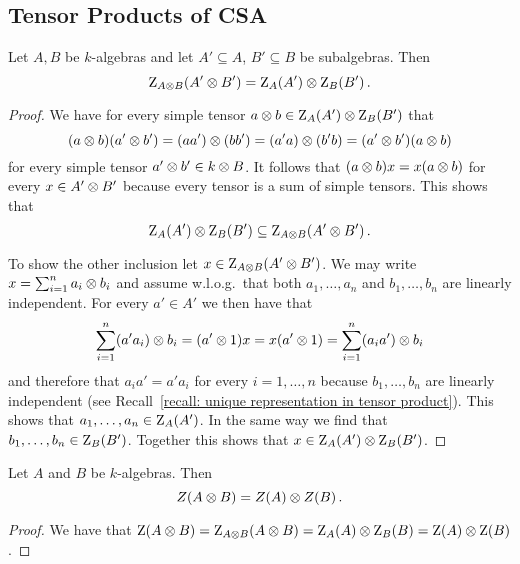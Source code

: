 \subsection{Tensor Products of CSA}


\begin{lemma}
  \label{lemma: centralizer componentwise}
  Let $A, B$ be $k$-algebras and let $A' \subseteq A$, $B' \subseteq B$ be subalgebras.
  Then
  \[
      \operatorname{Z}_{A \mathbin{\otimes} B}(A' \mathbin{\otimes} B')
    = \operatorname{Z}_A(A') \mathbin{\otimes} \operatorname{Z}_B(B') \,.
  \]
\end{lemma}


\begin{proof}
  We have for every simple tensor $a \mathbin{\otimes} b \in \operatorname{Z}_A(A') \mathbin{\otimes} \operatorname{Z}_B(B')$ that
  \[
      (a \mathbin{\otimes} b) (a' \mathbin{\otimes} b')
    = (aa') \mathbin{\otimes} (bb')
    = (a'a) \mathbin{\otimes} (b'b)
    = (a' \mathbin{\otimes} b')(a \mathbin{\otimes} b)
  \]
  for every simple tensor $a' \mathbin{\otimes} b' \in k \mathbin{\otimes} B$.
  It follows that $(a \mathbin{\otimes} b) x = x (a \mathbin{\otimes} b)$ for every $x \in A' \mathbin{\otimes} B'$ because every tensor is a sum of simple tensors.
  This shows that
  \[
              \operatorname{Z}_A(A') \mathbin{\otimes} \operatorname{Z}_B(B')
    \subseteq \operatorname{Z}_{A \mathbin{\otimes} B}(A' \mathbin{\otimes} B') \,.
  \]
  
  To show the other inclusion let $x \in \operatorname{Z}_{A \mathbin{\otimes} B}(A' \mathbin{\otimes} B')$.
  We may write $x = \sum_{i=1}^n a_i \mathbin{\otimes} b_i$ and assume w.l.o.g.\ that both $a_1, \dotsc, a_n$ and $b_1, \dotsc, b_n$ are linearly independent.
  For every $a' \in A'$ we then have that
  \[
      \sum_{i=1}^n (a' a_i) \mathbin{\otimes} b_i
    = (a' \mathbin{\otimes} 1) x
    = x (a' \mathbin{\otimes} 1)
    = \sum_{i=1}^n (a_i a') \mathbin{\otimes} b_i
  \]
  and therefore that $a_i a' = a' a_i$ for every $i = 1, \dotsc, n$ because $b_1, \dotsc, b_n$ are linearly independent (see Recall~\ref{recall: unique representation in tensor product}).
  This shows that $a_1, \dotsc, a_n \in \operatorname{Z}_{A}(A')$.
  In the same way we find that $b_1, \dotsc, b_n \in \operatorname{Z}_{B}(B')$.
  Together this shows that $x \in \operatorname{Z}_A(A') \mathbin{\otimes} \operatorname{Z}_B(B')$.
\end{proof}


\begin{corollary}
  \label{corollary: center of tensor product}
  Let $A$ and $B$ be $k$-algebras.
  Then
  \[
      Z(A \mathbin{\otimes} B)
    = Z(A) \mathbin{\otimes} Z(B) \,.
  \]
\end{corollary}


\begin{proof}
  We have that
  $
      \operatorname{Z}(A \mathbin{\otimes} B)
    = \operatorname{Z}_{A \mathbin{\otimes} B}(A \mathbin{\otimes} B)
    = \operatorname{Z}_A(A) \mathbin{\otimes} \operatorname{Z}_B(B)
    = \operatorname{Z}(A) \mathbin{\otimes} \operatorname{Z}(B)
  $.
\end{proof}



